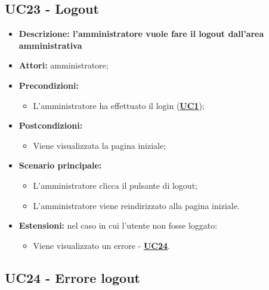\subsection{UC23 - Logout}
\label{sec:UC23}
\begin{itemize}
	\item \textbf{Descrizione: l'amministratore vuole fare il logout dall'area amministrativa} 
	\item \textbf{Attori:} amministratore;
	\item \textbf{Precondizioni:} 
	\begin{itemize}
		\item L’amministratore ha effettuato il login (\hyperref[sec:UC1]{\textbf{UC1}});
	\end{itemize}
	\item \textbf{Postcondizioni:} 
	\begin{itemize}
		\item Viene visualizzata la pagina iniziale;
	\end{itemize}
	\item \textbf{Scenario principale:} 
	\begin{itemize}
		\item L’amministratore clicca il pulsante di logout;
		\item L’amministratore viene reindirizzato alla pagina iniziale.
	\end{itemize}
	\item \textbf{Estensioni:} nel caso in cui l'utente non fosse loggato:
	\begin{itemize}
		\item Viene visualizzato un errore - \hyperref[sec:UC24]{\textbf{UC24}}.
	\end{itemize}
\end{itemize}

\subsection{UC24 - Errore logout}
\label{sec:UC24}

